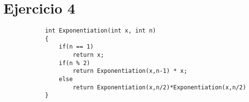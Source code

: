 \documentclass[10pt,a4paper]{article}
\begin{document}
    \section{Ejercicio 4}
        \begin{lstlisting}
            int Exponentiation(int x, int n)
            {
                if(n == 1) 
                    return x;
                if(n % 2) 
                    return Exponentiation(x,n-1) * x;
                else 
                    return Exponentiation(x,n/2)*Exponentiation(x,n/2)  
            }
        \end{lstlisting}
        
\end{document}
